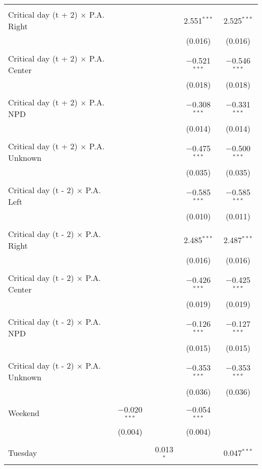 \documentclass[
]{article}
\begin{document}
\begin{table}[!htbp]
{\begin{tabular}{@{\extracolsep{5pt}}lcccc}
  & & & & \\ 
 Critical day (t + 2) $\times$ P.A. Right &  &  & 2.551$^{***}$ & 2.525$^{***}$ \\ 
  &  &  & (0.016) & (0.016) \\ 
  & & & & \\ 
 Critical day (t + 2) $\times$ P.A. Center &  &  & $-$0.521$^{***}$ & $-$0.546$^{***}$ \\ 
  &  &  & (0.018) & (0.018) \\ 
  & & & & \\ 
 Critical day (t + 2) $\times$ P.A. NPD &  &  & $-$0.308$^{***}$ & $-$0.331$^{***}$ \\ 
  &  &  & (0.014) & (0.014) \\ 
  & & & & \\ 
 Critical day (t + 2) $\times$ P.A. Unknown &  &  & $-$0.475$^{***}$ & $-$0.500$^{***}$ \\ 
  &  &  & (0.035) & (0.035) \\ 
  & & & & \\ 
 Critical day (t - 2) $\times$ P.A. Left &  &  & $-$0.585$^{***}$ & $-$0.585$^{***}$ \\ 
  &  &  & (0.010) & (0.011) \\ 
  & & & & \\ 
 Critical day (t - 2) $\times$ P.A. Right &  &  & 2.485$^{***}$ & 2.487$^{***}$ \\ 
  &  &  & (0.016) & (0.016) \\ 
  & & & & \\ 
 Critical day (t - 2) $\times$ P.A. Center &  &  & $-$0.426$^{***}$ & $-$0.425$^{***}$ \\ 
  &  &  & (0.019) & (0.019) \\ 
  & & & & \\ 
 Critical day (t - 2) $\times$ P.A. NPD &  &  & $-$0.126$^{***}$ & $-$0.127$^{***}$ \\ 
  &  &  & (0.015) & (0.015) \\ 
  & & & & \\ 
 Critical day (t - 2) $\times$ P.A. Unknown &  &  & $-$0.353$^{***}$ & $-$0.353$^{***}$ \\ 
  &  &  & (0.036) & (0.036) \\ 
  & & & & \\ 
 Weekend & $-$0.020$^{***}$ &  & $-$0.054$^{***}$ &  \\ 
  & (0.004) &  & (0.004) &  \\ 
  & & & & \\ 
 Tuesday &  & 0.013$^{*}$ &  & 0.047$^{***}$ \\ 

\end{tabular}}
\end{table}
\end{document}
